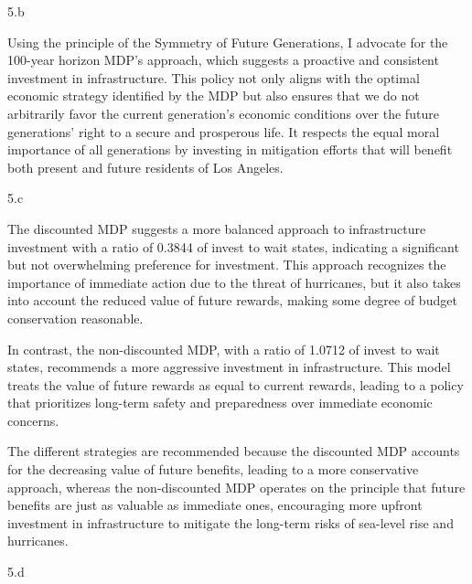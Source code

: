 \LARGE
5.b
\normalsize

\begin{answer}
  Using the principle of the Symmetry of Future Generations, I advocate for the 100-year horizon MDP's approach, which suggests a proactive and consistent investment in infrastructure. This policy not only aligns with the optimal economic strategy identified by the MDP but also ensures that we do not arbitrarily favor the current generation's economic conditions over the future generations' right to a secure and prosperous life. It respects the equal moral importance of all generations by investing in mitigation efforts that will benefit both present and future residents of Los Angeles.
\end{answer}
\clearpage


\LARGE
5.c
\normalsize

\begin{answer}
  The discounted MDP suggests a more balanced approach to infrastructure investment with a ratio of 0.3844 of invest to wait states, indicating a significant but not overwhelming preference for investment. This approach recognizes the importance of immediate action due to the threat of hurricanes, but it also takes into account the reduced value of future rewards, making some degree of budget conservation reasonable.

  In contrast, the non-discounted MDP, with a ratio of 1.0712 of invest to wait states, recommends a more aggressive investment in infrastructure. This model treats the value of future rewards as equal to current rewards, leading to a policy that prioritizes long-term safety and preparedness over immediate economic concerns.

  The different strategies are recommended because the discounted MDP accounts for the decreasing value of future benefits, leading to a more conservative approach, whereas the non-discounted MDP operates on the principle that future benefits are just as valuable as immediate ones, encouraging more upfront investment in infrastructure to mitigate the long-term risks of sea-level rise and hurricanes.
\end{answer}
\clearpage


\LARGE
5.d
\normalsize

